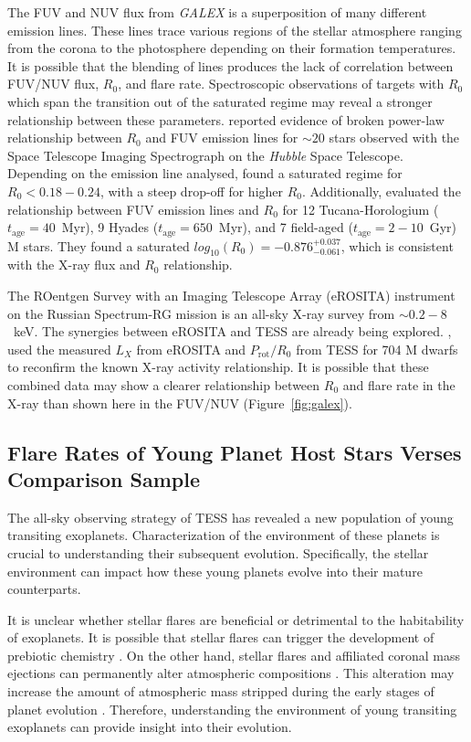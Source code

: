 \documentclass[twocolumn]{aastex631}
\begin{document}
The FUV and NUV flux from \textit{GALEX} is a superposition of many different emission lines. These lines  trace various regions of the stellar atmosphere ranging from the corona to the
photosphere depending on their formation temperatures. It is possible that the blending of lines produces the lack of correlation between FUV/NUV flux, $R_0$, and flare rate. Spectroscopic
observations of targets with $R_0$ which span the transition out of the saturated regime may reveal a stronger relationship between these parameters. \cite{pineda21} reported evidence of broken
power-law relationship between $R_0$ and FUV emission lines for $\sim 20$ stars observed with the Space Telescope Imaging Spectrograph on the \textit{Hubble} Space Telescope. Depending on the
emission line analysed, \cite{pineda21} found a saturated regime for $R_0 < 0.18 - 0.24$, with a steep drop-off for higher $R_0$. Additionally, \cite{loyd21} evaluated the relationship between
FUV emission lines and $R_0$ for 12  Tucana-Horologium ($t_\textrm{age} = 40$~Myr), 9 Hyades  ($t_\textrm{age} = 650$~Myr), and 7 field-aged ($t_\textrm{age} = 2-10$~Gyr) M stars. They found a
saturated $log_{10}(R_0) = -0.876_{-0.061}^{+0.037}$, which is consistent with the X-ray flux and $R_0$ relationship.

The ROentgen Survey with an Imaging Telescope Array (eROSITA) instrument \citep{predehl07, predehl21} on the Russian Spectrum-RG mission is an all-sky X-ray survey from $\sim 0.2-8$~keV. The
synergies between eROSITA and TESS are already being explored. \cite{magaudda22}, used the measured $L_X$ from eROSITA and $P_\textrm{rot}/R_0$ from TESS for 704 M dwarfs to reconfirm the known
X-ray activity relationship. It is possible that these combined data may show a  clearer relationship between $R_0$ and flare rate in the X-ray than shown here  in the FUV/NUV (Figure~\ref{fig:galex}).

\subsection{Flare Rates of Young Planet Host Stars Verses Comparison Sample}

The all-sky observing strategy of TESS has revealed a new population of young transiting exoplanets.  Characterization of the  environment of these planets is crucial to understanding their
subsequent evolution. Specifically, the stellar environment can impact how these young planets evolve into their mature counterparts.

It is unclear whether stellar flares are beneficial or detrimental to the habitability of exoplanets. It is possible that stellar flares can trigger the development of prebiotic chemistry
\citep{Rugheimer2015,airapetian16,Ranjan2017,Rimmer2018}. On the other hand, stellar flares and affiliated coronal mass ejections can permanently alter atmospheric compositions \citep{chen21}.
This alteration may increase the amount of atmospheric mass stripped during the early stages of planet evolution \citep{feinstein20}. Therefore,  understanding the environment of young
transiting exoplanets can  provide insight into their evolution.
\end{document}

